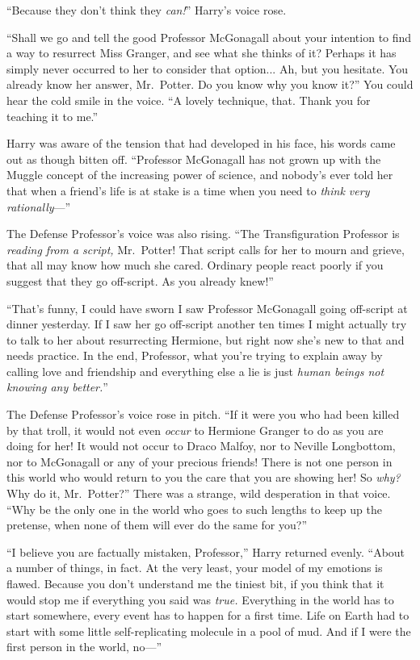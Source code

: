 “Because they don’t think they \emph{can!}” Harry’s voice rose.

“Shall we go and tell the good Professor McGonagall about your intention to find a way to resurrect Miss Granger, and see what she thinks of it? Perhaps it has simply never occurred to her to consider that option... Ah, but you hesitate. You already know her answer, Mr.~Potter. Do you know why you know it?” You could hear the cold smile in the voice. “A lovely technique, that. Thank you for teaching it to me.”

Harry was aware of the tension that had developed in his face, his words came out as though bitten off. “Professor McGonagall has not grown up with the Muggle concept of the increasing power of science, and nobody’s ever told her that when a friend’s life is at stake is a time when you need to \emph{think very rationally}—”

The Defense Professor’s voice was also rising. “The Transfiguration Professor is \emph{reading from a script,} Mr.~Potter! That script calls for her to mourn and grieve, that all may know how much she cared. Ordinary people react poorly if you suggest that they go off-script. As you already knew!”

“That’s funny, I could have sworn I saw Professor McGonagall going off-script at dinner yesterday. If I saw her go off-script another ten times I might actually try to talk to her about resurrecting Hermione, but right now she’s new to that and needs practice. In the end, Professor, what you’re trying to explain away by calling love and friendship and everything else a lie is just \emph{human beings not knowing any better.}”

The Defense Professor’s voice rose in pitch. “If it were you who had been killed by that troll, it would not even \emph{occur} to Hermione Granger to do as you are doing for her! It would not occur to Draco Malfoy, nor to Neville Longbottom, nor to McGonagall or any of your precious friends! There is not one person in this world who would return to you the care that you are showing her! So \emph{why?} Why do it, Mr.~Potter?” There was a strange, wild desperation in that voice. “Why be the only one in the world who goes to such lengths to keep up the pretense, when none of them will ever do the same for you?”

“I believe you are factually mistaken, Professor,” Harry returned evenly. “About a number of things, in fact. At the very least, your model of my emotions is flawed. Because you don’t understand me the tiniest bit, if you think that it would stop me if everything you said was \emph{true.} Everything in the world has to start somewhere, every event has to happen for a first time. Life on Earth had to start with some little self-replicating molecule in a pool of mud. And if I were the first person in the world, no—”

